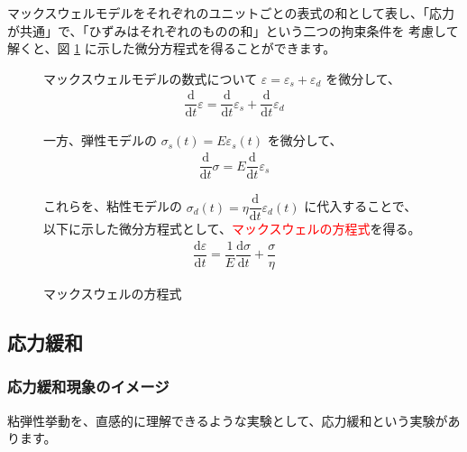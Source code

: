 \documentclass[uplatex,dvipdfmx,a4paper,11pt]{jsreport}
\begin{document}
マックスウェルモデルをそれぞれのユニットごとの表式の和として表し、「応力が共通」で、「ひずみはそれぞれのものの和」という二つの拘束条件を
考慮して解くと、図 \ref{fig:maxwell_eq} に示した微分方程式を得ることができます。
\begin{figure}[htb]
	\begin{center}
		\begin{minipage}{0.9\textwidth}
			\begin{itembox}[l]{マックスウェルモデルの数式について}
				$\varepsilon = \varepsilon_s + \varepsilon_d$ を微分して、
				\begin{align*}
					\dfrac{\mathrm{d}}{\mathrm{d}t}\varepsilon = \dfrac{\mathrm{d}}{\mathrm{d}t}\varepsilon_s + \dfrac{\mathrm{d}}{\mathrm{d}t}\varepsilon_d
				\end{align*}
				
				一方、弾性モデルの $\sigma_s(t) = E \varepsilon_s(t)$ を微分して、
				\begin{align*}
					\dfrac{\mathrm{d}}{\mathrm{d}t}\sigma = E \dfrac{\mathrm{d}}{\mathrm{d}t}\varepsilon_s
				\end{align*}
		
				これらを、粘性モデルの $\sigma_d(t) = \eta \dfrac{\mathrm{d}}{\mathrm{d}t}\varepsilon_d(t)$ に代入することで、
				以下に示した微分方程式として、\textcolor{red}{マックスウェルの方程式}を得る。
				\color{red}
				\begin{align*}
					\dfrac{\mathrm{d}\varepsilon}{\mathrm{d}t} = \dfrac{1}{E} \dfrac{\mathrm{d}\sigma}{\mathrm{d}t} + \dfrac{\sigma}{\eta}
				\end{align*}
			\end{itembox}
		\end{minipage}
		\caption{マックスウェルの方程式}
		\label{fig:maxwell_eq}
	\end{center}
\end{figure}

\subsection{応力緩和}

\subsubsection{応力緩和現象のイメージ}
粘弾性挙動を、直感的に理解できるような実験として、応力緩和という実験があります。
\end{document}
